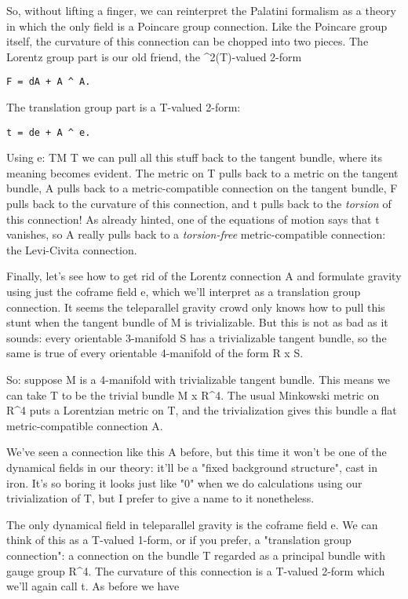So, without lifting a finger, we can reinterpret the Palatini formalism
as a theory in which the only field is a Poincare group connection. 
Like the Poincare group itself, the curvature of this connection can be
chopped into two pieces.  The Lorentz group part is our old friend, the
\Lambda ^{2}(T)-valued 2-form 

\begin{verbatim}
F = dA + A ^ A.
\end{verbatim}
    
The translation group part is a T-valued 2-form:

\begin{verbatim}
t = de + A ^ e.
\end{verbatim}
    
Using e: TM \to  T we can pull all this stuff back to the tangent bundle,
where its meaning becomes evident.  The metric on T pulls back to a
metric on the tangent bundle, A pulls back to a metric-compatible
connection on the tangent bundle, F pulls back to the curvature of this
connection, and t pulls back to the \emph{torsion} of this connection!   As 
already hinted, one of the equations of motion says that t vanishes, so
A really pulls back to a \emph{torsion-free} metric-compatible connection:
the Levi-Civita connection.

Finally, let's see how to get rid of the Lorentz connection A and
formulate gravity using just the coframe field e, which we'll interpret
as a translation group connection.  It seems the teleparallel gravity
crowd only knows how to pull this stunt when the tangent bundle of M is
trivializable.  But this is not as bad as it sounds: every orientable
3-manifold S has a trivializable tangent bundle, so the same is true of
every orientable 4-manifold of the form R x S.  

So: suppose M is a 4-manifold with trivializable tangent bundle.  This
means we can take T to be the trivial bundle M x R^{4}.  The usual
Minkowski metric on R^{4} puts a Lorentzian metric on T, and the
trivialization gives this bundle a flat metric-compatible connection A.

We've seen a connection like this A before, but this time it won't be
one of the dynamical fields in our theory: it'll be a "fixed background
structure", cast in iron.  It's so boring it looks just like "0" when we
do calculations using our trivialization of T, but I prefer to give a
name to it nonetheless.  

The only dynamical field in teleparallel gravity is the coframe field e.
We can think of this as a T-valued 1-form, or if you prefer, a
"translation group connection": a connection on the bundle T regarded 
as a principal bundle with gauge group R^{4}.  The curvature of this
connection is a T-valued 2-form which we'll again call t.  As before
we have

